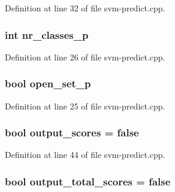 Definition at line 32 of file svm-\/predict.\-cpp.

\hypertarget{svm-predict_8cpp_a7f5f60f72ac3c9c0dfe1c1873dff770f}{
\subsubsection[{nr\-\_\-classes\-\_\-p}]{\setlength{\rightskip}{0pt plus 5cm}int nr\-\_\-classes\-\_\-p}}\label{svm-predict_8cpp_a7f5f60f72ac3c9c0dfe1c1873dff770f}


Definition at line 26 of file svm-\/predict.\-cpp.

\hypertarget{svm-predict_8cpp_af292311da2955e8e2dd274443d57ee3a}{
\subsubsection[{open\-\_\-set\-\_\-p}]{\setlength{\rightskip}{0pt plus 5cm}bool open\-\_\-set\-\_\-p}}\label{svm-predict_8cpp_af292311da2955e8e2dd274443d57ee3a}


Definition at line 25 of file svm-\/predict.\-cpp.

\hypertarget{svm-predict_8cpp_a7ce2b5cbc37a137a91ecc0cf035faba7}{
\subsubsection[{output\-\_\-scores}]{\setlength{\rightskip}{0pt plus 5cm}bool output\-\_\-scores = false}}\label{svm-predict_8cpp_a7ce2b5cbc37a137a91ecc0cf035faba7}


Definition at line 44 of file svm-\/predict.\-cpp.

\hypertarget{svm-predict_8cpp_aa63d504586762ed1e2b057a76018d0fd}{
\subsubsection[{output\-\_\-total\-\_\-scores}]{\setlength{\rightskip}{0pt plus 5cm}bool output\-\_\-total\-\_\-scores = false}}\label{svm-predict_8cpp_aa63d504586762ed1e2b057a76018d0fd}



